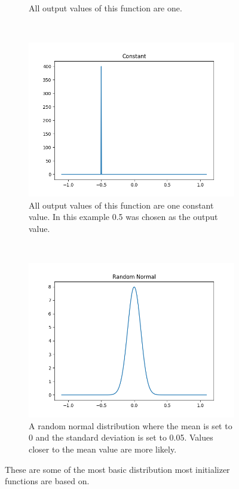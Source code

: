 \begin{figure}[h!]
\begin{subfigure}[t]{0.5\textwidth}
		\caption{All output values of this function are one.}
	\end{subfigure}
	~
	\begin{subfigure}[t]{0.5\textwidth}
		\centering
		\includegraphics[width=\textwidth]{img/methodology_neuralNetwork_initializerFunctions_constant.png}
		\caption{All output values of this function are one constant value. In this example 0.5 was chosen as the output value.}
	\end{subfigure}%
	~ 
	\begin{subfigure}[t]{0.5\textwidth}
		\centering
		\includegraphics[width=\textwidth]{img/methodology_neuralNetwork_initializerFunctions_randomNormal.png}
		\caption{A random normal distribution where the mean is set to 0 and the standard deviation is set to 0.05. Values closer to the mean value are more likely.}
	\end{subfigure}
	\caption{These are some of the most basic distribution most initializer functions are based on.}
	\label{pic:methodology_neuralNetwork_initializerFunctions1}
\end{figure}

